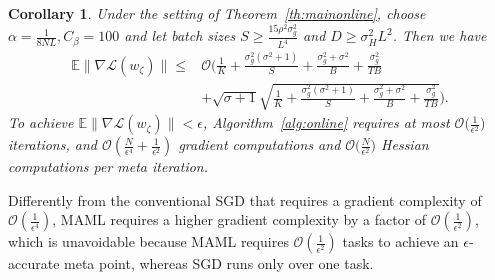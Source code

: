 \documentclass{osudissert96}
\newtheorem{corollary}{Corollary}
\begin{document}
\begin{corollary}\label{co:online}
	Under the setting of Theorem~\ref{th:mainonline}, choose $\alpha = \frac{1}{8NL}, C_\beta = 100$ and let batch sizes $S\geq \frac{15\rho^2\sigma_g^2}{L^4}$ and $D\geq \sigma_H^2 L^2$. Then we have %
	\begin{align*}
	\mathbb{E}\|\nabla \mathcal{L}(w_\zeta) \|  \leq &\mathcal{O} \Big(  \frac{1}{K} + \frac{\sigma_g^2(\sigma^2+1)}{S} + \frac{\sigma_g^2 +\sigma^2}{B} +\frac{\sigma^2_g}{TB} 
	\\&+ \sqrt{\sigma +1}\sqrt{\frac{1}{K} + \frac{\sigma_g^2(\sigma^2+1)}{S} + \frac{\sigma_g^2 +\sigma^2}{B}+\frac{\sigma^2_g}{TB}}\Big).
	\end{align*}
To achieve $\mathbb{E}\|\nabla \mathcal{L}(w_\zeta) \|<\epsilon$, Algorithm~\ref{alg:online} requires at most  $\mathcal{O}\big(\frac{1}{\epsilon^2}\big)$ iterations, and $\mathcal{O}(\frac{N}{\epsilon^4}+\frac{1}{\epsilon^{2}})$ gradient computations and $\mathcal{O}\big(\frac{N}{\epsilon^{2}}\big)$ Hessian computations per meta iteration. 
\end{corollary}
\vspace{-0.15cm}


Differently from the conventional SGD that requires a gradient complexity of { $\mathcal{O}(\frac{1}{\epsilon^{4}})$}, MAML requires a higher gradient complexity by a factor of { $\mathcal{O}(\frac{1}{\epsilon^{2}})$}, which is unavoidable because MAML requires  { $\mathcal{O}(\frac{1}{\epsilon^{2}})$}  tasks to achieve an $\epsilon$-accurate meta point, whereas SGD runs only over one task.  
\end{document}
